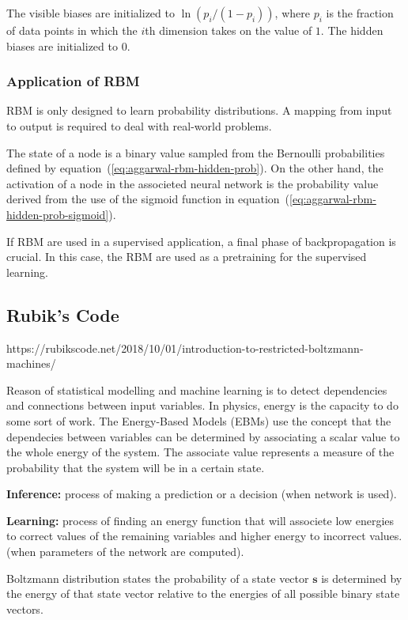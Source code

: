 The visible biases are initialized to $\ln(p_{i}/(1 - p_{i}))$, where $p_{i}$ is the fraction of data points in which the $i$th dimension takes on the value of $1$.
The hidden biases are initialized to $0$.



\subsubsection{Application of RBM}
RBM is only designed to learn probability distributions.
A mapping from input to output is required to deal with real-world problems.

The state of a node is a binary value sampled from the Bernoulli probabilities defined by equation~(\ref{eq:aggarwal-rbm-hidden-prob}).
On the other hand, the activation of a node in the associeted neural network is the probability value derived from the use of the sigmoid function in equation~(\ref{eq:aggarwal-rbm-hidden-prob-sigmoid}).

If RBM are used in a supervised application, a final phase of backpropagation is crucial.
In this case, the RBM are used as a pretraining for the supervised learning.




\subsection{Rubik's Code}

https://rubikscode.net/2018/10/01/introduction-to-restricted-boltzmann-machines/

Reason of statistical modelling and machine learning is to detect dependencies and connections between input variables.
In physics, energy is the capacity to do some sort of work.
The Energy-Based Models (EBMs) use the concept that the dependecies between variables can be determined by associating a scalar value to the whole energy of the system.
The associate value represents a measure of the probability that the system will be in a certain state.

\textbf{Inference:} process of making a prediction or a decision (when network is used).

\textbf{Learning:} process of finding an energy function that will associete low energies to correct values of the remaining variables and higher energy to incorrect values. (when parameters of the network are computed).

Boltzmann distribution states the probability of a state vector $\mathbf{s}$ is determined by the energy of that state vector relative to the energies of all possible binary state vectors.

